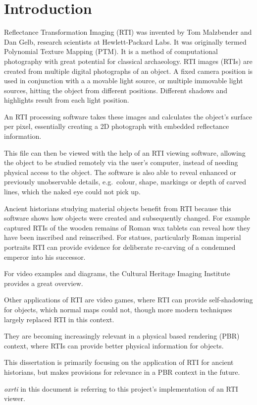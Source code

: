 \section{Introduction}
Reflectance Transformation Imaging (RTI) was  invented by Tom Malzbender and Dan
Gelb, research scientists at Hewlett-Packard Labs. It was originally termed
Polynomial Texture Mapping (PTM). It is a method of computational photography
with great potential for classical archaeology. RTI images (RTIs) are created from
multiple digital photographs of an object. A fixed camera position is used in
conjunction with a a movable light source, or multiple immovable light sources, hitting the object from different positions. Different shadows and highlights result from
each light position.

An RTI processing software takes these images and calculates the object's
surface per pixel, essentially creating a 2D photograph with embedded
reflectance information.

This file can then be viewed with the help of an RTI viewing software, allowing
the object to be studied remotely via the user's computer, instead of needing
physical access to the object. The software is also able to reveal enhanced or
previously unobservable details, e.g.\ colour, shape, markings or depth of
carved lines, which the naked eye could not pick up.

Ancient historians studying material objects benefit from RTI because this
software shows how objects were created and subsequently changed. For example
captured RTIs of the wooden remains of Roman wax tablets can reveal how they
have been inscribed and reinscribed. For statues, particularly Roman imperial
portraits RTI can provide evidence for deliberate re-carving of a condemned
emperor into his successor.

For video examples and diagrams, the Cultural Heritage Imaging Institute provides a great overview\cite*{noauthor_cultural_nodate}.

Other applications of RTI are video games, where RTI can provide self-shadowing
for objects, which normal maps could not, though more modern techniques largely
replaced RTI in this context.

They are becoming increasingly relevant in a physical based rendering (PBR) context,
where RTIs can provide better physical information for objects.

This dissertation is primarily focusing on the application of RTI for ancient
historians, but makes provisions for relevance in a PBR context in the future.

\emph{oxrti} in this document is referring to this project's implementation of an
RTI viewer.